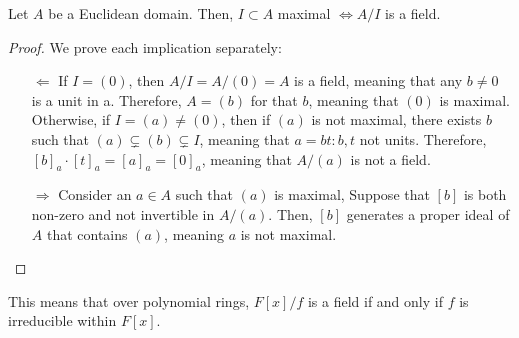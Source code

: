 \begin{theorem*}
  Let $A$ be a Euclidean domain. Then, $I \subset A$ maximal $\Leftrightarrow A/I$ is a field. 
\end{theorem*}
\begin{proof}
  We prove each implication separately: 
  \begin{itemize}
    \item[$\Leftarrow$] If $I = (0)$, then $A/I = A/(0) = A$ is a field, meaning that any $b \neq 0$ is a unit in a. Therefore, $A = (b)$ for that $b$, meaning that $(0)$ is maximal. Otherwise, if $I = (a) \neq (0)$, then if $(a)$ is not maximal, there exists $b$ such that $(a) \subsetneq (b) \subsetneq I$, meaning that $a = bt: b, t$ not units. Therefore, $[b]_a \cdot [t]_a = [a]_a = [0]_a$, meaning that $A/(a)$ is not a field. 
    \item[$\Rightarrow$] Consider an $a \in A$ such that $(a)$ is maximal, Suppose that $[b]$ is both non-zero and not invertible in $A/(a)$. Then, $[b]$ generates a proper ideal of $A$ that contains $(a)$, meaning $a$ is not maximal. 
  \end{itemize}
\end{proof}

This means that over polynomial rings, $F[x]/f$ is a field if and only if $f$ is irreducible within $F[x]$. 


